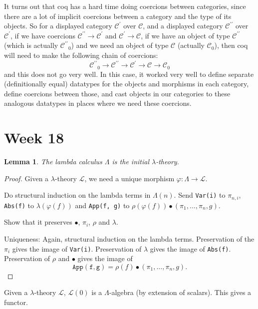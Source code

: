\documentclass{amsbook}
\newcommand{\Ob}[1]{{#1}_0}
\newtheorem{lemma}{Lemma}
\theoremstyle{definition}
\begin{document}
  It turns out that coq has a hard time doing coercions between categories, since there are a lot of implicit coercions between a category and the type of its objects. So for a displayed category $ \mathcal C^\prime $ over $ \mathcal C $, and a displayed category $ \mathcal C^{\prime \prime} $ over $ \mathcal C^\prime $, if we have coercions $ \mathcal C^{\prime \prime} \to \mathcal C^\prime $ and $ \mathcal C^\prime \to \mathcal C $, if we have an object of type $ \mathcal C^{\prime \prime} $ (which is actually $ \Ob{\mathcal C^{\prime \prime}} $) and we need an object of type $ \mathcal C $ (actually $ \Ob{\mathcal C} $), then coq will need to make the following chain of coercions:
  \[ \Ob{\mathcal C^{\prime \prime}} \to \mathcal C^{\prime \prime} \to \mathcal C^\prime \to \mathcal C \to \Ob{\mathcal C} \]
  and this does not go very well. In this case, it worked very well to define separate (definitionally equal) datatypes for the objects and morphisms in each category, define coercions between those, and cast objects in our categories to these analogous datatypes in places where we need these coercions.

  \chapter*{Week 18}

  \begin{lemma}
    The lambda calculus $ \Lambda $ is the initial $ \lambda $-theory.
  \end{lemma}
  \begin{proof}
    Given a $ \lambda $-theory $ \mathcal L $, we need a unique morphism $ \varphi : \Lambda \to \mathcal L $.

    Do structural induction on the lambda terms in $ \Lambda(n) $. Send \texttt{Var(i)} to $ \pi_{n, i} $, \texttt{Abs(f)} to $ \lambda(\varphi(f)) $ and \texttt{App(f, g)} to $ \rho(\varphi(f)) \bullet (\pi_1, \dots, \pi_n, g) $.

    Show that it preserves $ \bullet $, $ \pi_{i} $, $ \rho $ and $ \lambda $.

    Uniqueness: Again, structural induction on the lambda terms. Preservation of the $ \pi_i $ gives the image of \texttt{Var(i)}. Preservation of $ \lambda $ gives the image of \texttt{Abs(f)}. Preservation of $ \rho $ and $ \bullet $ gives the image of
    \[ \mathtt{App(f, g)} = \rho(f) \bullet (\pi_1, \dots, \pi_n, g). \]
  \end{proof}

  Given a $ \lambda $-theory $ \mathcal L $, $ \mathcal L(0) $ is a $ \Lambda $-algebra (by extension of scalars). This gives a functor.
\end{document}
